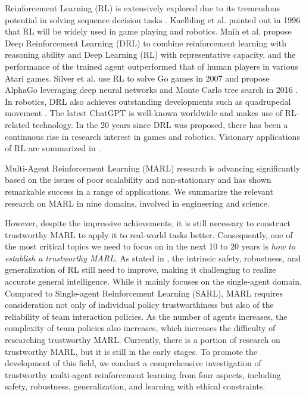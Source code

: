 \documentclass[acmsmall]{acmart}
\begin{document}
Reinforcement Learning (RL) is extensively explored due to its tremendous potential in solving sequence decision tasks \cite{dqn,doubleq,duelq,ac, a3c,trpo,ppo,ddpg,REINFORCE}. Kaelbling et al. pointed out in 1996 \cite{1996Reinforcement} that RL will be widely used in game playing and robotics. Mnih et al.  \cite{dqn2013} propose Deep Reinforcement Learning (DRL) to combine reinforcement learning with reasoning ability and Deep Learning (RL) with representative capacity, and the performance of the trained agent outperformed that of human players in various Atari games.
Silver et al. use RL to solve Go games in  2007\cite{2007Go} and propose AlphaGo leveraging deep neural networks and Monte Carlo tree search in 2016 \cite{2016AlphaGo}. In robotics, DRL also achieves outstanding developments such as quadrupedal movement  \cite{quadrupedal1, quadrupedal2}. The latest ChatGPT is well-known worldwide and makes use of RL-related technology. In the 20 years since DRL was proposed, there has been a continuous rise in research interest in games and robotics. Visionary applications of RL are summarized in \cite{1996Reinforcement}.


Multi-Agent Reinforcement Learning (MARL) research is advancing significantly based on the issues of poor scalability and non-stationary and has shown remarkable success in a range of applications. We summarize the relevant research on MARL in nine domains, involved in engineering and science. 

However, despite the impressive achievements, it is still necessary to construct trustworthy MARL to apply it to real-world tasks better. Consequently, one of the most critical topics we need to focus on in the next 10 to 20 years is \emph{how to establish a trustworthy MARL}. As stated in \cite{trustRL}, the intrinsic safety, robustness, and generalization of RL still need to improve, making it challenging to realize accurate general intelligence. 
While it mainly focuses on the single-agent domain. Compared to Single-agent Reinforcement Learning (SARL), MARL requires consideration not only of individual policy trustworthiness but also of the reliability of team interaction policies. As the number of agents increases, the complexity of team policies also increases, which increases the difficulty of researching trustworthy MARL. Currently, there is a portion of research on trustworthy MARL, but it is still in the early stages. To promote the development of this field, we conduct a comprehensive investigation of trustworthy multi-agent reinforcement learning from four aspects, including safety, robustness, generalization, and learning with ethical constraints.
\end{document}
